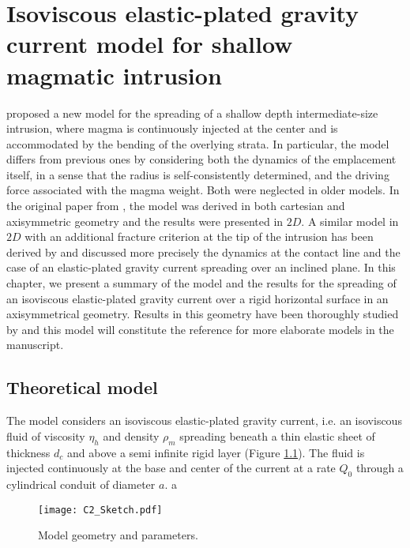 \chapter{Isoviscous elastic-plated  gravity current model  for shallow
  magmatic intrusion}

\label{chap2} 
\minitoc

\citet{Michaut:2011kg} proposed  a new  model for  the spreading  of a
shallow depth intermediate-size intrusion, where magma is continuously
injected  at the  center and  is accommodated  by the  bending of  the
overlying strata.  In particular, the model differs from previous ones
by considering both the dynamics of the emplacement itself, in a sense
that the radius is self-consistently determined, and the driving force
associated with the magma weight. Both were neglected in older models.  In
the original paper from  \citet{Michaut:2011kg}, the model was derived
in  both cartesian  and  axisymmetric geometry  and  the results  were
presented  in  $2D$.  A  similar  model  in  $2D$ with  an  additional
fracture criterion  at the tip  of the  intrusion has been  derived by
\citet{Bunger:2011cb}    and   \citet{Anonymous:QWXp_4JV}    discussed
more precisely the dynamics at the contact line and the case of an
elastic-plated gravity  current spreading over an  inclined plane.  In
this chapter,  we present a summary  of the model and  the results for
the spreading of an isoviscous elastic-plated gravity  current over a
rigid horizontal  surface in  an axisymmetrical geometry.   Results in
this geometry  have been  thoroughly studied  by \citet{Lister:2013ia}
and this model will constitute the reference for more elaborate models
in the manuscript.

\section{Theoretical model}
\label{C2-sec:model}

The model considers an isoviscous elastic-plated gravity current, i.e.
an  isoviscous  fluid  of  viscosity  $\eta_h$  and  density  $\rho_m$
spreading beneath a thin elastic sheet  of thickness $d_c$ and above a
semi infinite rigid layer \citep{Michaut:2011kg,Bunger:2011cb} (Figure
\ref{C2-Sketch}).  The fluid is injected  continuously at the base and
center of the current at a rate $Q_0$ through a cylindrical conduit of
diameter $a$.
a
\begin{figure}[h!]
  \begin{center}
    \graphicspath{ {/Users/thorey/Documents/These/Manuscript/Figure/Chapter2/} }
    \texttt{[image: C2\_Sketch.pdf]}
    \caption{Model geometry and parameters.}
    \label{C2-Sketch}
  \end{center}
\end{figure}

